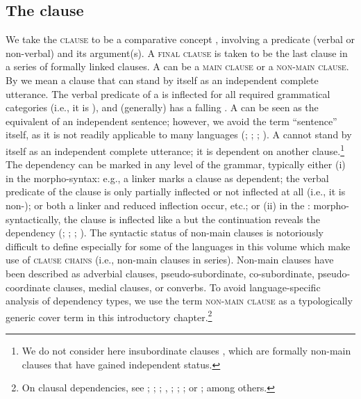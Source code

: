 \documentclass[output=paper]{LSP/langsci}
\begin{document}
\subsection{The clause}
\label{GuAi1.2clause}
We take the \textsc{clause} to be a comparative concept \citep[following][672]{haspelmath10}, involving a predicate (verbal or non-verbal) and its argument(s). A \textsc{final clause} is taken to be the last clause in a series of formally linked clauses. A  can be a \textsc{main clause} or a \textsc{non-main clause}. By  we mean a clause that can stand by itself as an independent complete utterance. The verbal predicate of a  is inflected for all required grammatical categories (i.e., it is ), and (generally) has a falling  \citep{fitzpatrick.2000}. A  can be seen as the equivalent of an independent sentence; however, we avoid the term ``sentence'' itself, as it is not readily applicable to many languages (\citealt[][132--133]{dixon10}; \citealt{Longacre1970}; \citealt{Miller1995}; \citealt{Mithun2005}). A  cannot stand by itself as an independent complete utterance; it is dependent on another clause.\footnote{We do not consider here insubordinate clauses \citep{evans07}, which are formally non-main clauses that have gained independent status.} The dependency can be marked in any  level of the grammar, typically either (i) in the morpho-syntax: e.g., a linker marks a clause as dependent; the verbal predicate of the clause is only partially inflected or not inflected at all (i.e., it is non-); or both a linker and reduced inflection occur, etc.; or (ii) in the : morpho-syntactically, the clause is inflected like a  but the continuation  reveals the dependency (\citealt{bolinger.1984}; \citealt[][9--10]{chafe88}; \citealt[][23--24, 31]{genetti04}; \citealt{Mithun2009}). The syntactic status of non-main clauses is notoriously difficult to define especially for some of the languages in this volume which make use of \textsc{clause chains} (i.e., non-main clauses in series). Non-main clauses have been described as adverbial clauses, pseudo-subordinate, co-subordinate, pseudo-coordinate clauses, medial clauses, or converbs. To avoid language-specific analysis of dependency types, we use the term \textsc{non-main clause} as a typologically generic cover term in this introductory chapter.\footnote{On clausal dependencies, see \citealt{cristofaro05};  \citealt{culicover.1997};  \citealt{haiman.1984}; \citealt{Haspelmath.1995}, \citealt{haspelmath2004}; \citealt[][398--417]{longacre07}; \citealt{valin84}; or  \citealt{Yuasa02}; among others.}
\end{document}
